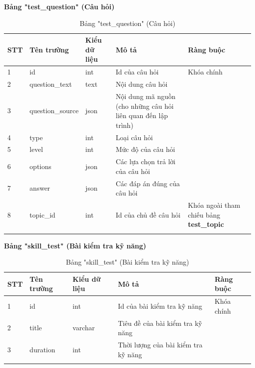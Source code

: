 \documentclass[../DoAn.tex]{subfiles}
\begin{document}
\textbf{Bảng "test\_question" (Câu hỏi)}
\begin{longtable}{|p{}|p{}|p{}|p{}|p{}|}
\hline
\textbf{STT} & \textbf{Tên trường} & \textbf{Kiểu dữ liệu} & \textbf{Mô tả } & \textbf{Ràng buộc} \\ \hline
1   & id & int & Id của câu hỏi & Khóa chính \\ \hline
2   & question\_text & text & Nội dung câu hỏi & \\ \hline
3   & question\_source & json & Nội dung mã nguồn (cho những câu hỏi liên quan đến lập trình) & \\ \hline
4   & type & int & Loại câu hỏi & \\ \hline
5   & level & int & Mức độ của câu hỏi & \\ \hline
6   & options & json & Các lựa chọn trả lời của câu hỏi & \\ \hline
7   & answer & json & Các đáp án đúng của câu hỏi & \\ \hline
8   & topic\_id & int & Id của chủ đề câu hỏi & Khóa ngoài tham chiếu bảng \textbf{test\_topic} \\ \hline
\caption{Bảng "test\_question" (Câu hỏi)}
\end{longtable}

\textbf{Bảng "skill\_test" (Bài kiểm tra kỹ năng)}
\begin{longtable}{|p{}|p{}|p{}|p{}|p{}|}
\hline
\textbf{STT} & \textbf{Tên trường} & \textbf{Kiểu dữ liệu} & \textbf{Mô tả } & \textbf{Ràng buộc} \\ \hline
1   & id & int & Id của bài kiểm tra kỹ năng & Khóa chính \\ \hline
2   & title & varchar & Tiêu đề của bài kiểm tra kỹ năng & \\ \hline
3   & duration & int & Thời lượng của bài kiểm tra kỹ năng & \\ \hline
\caption{Bảng "skill\_test" (Bài kiểm tra kỹ năng)}
\end{longtable}
\end{document}
